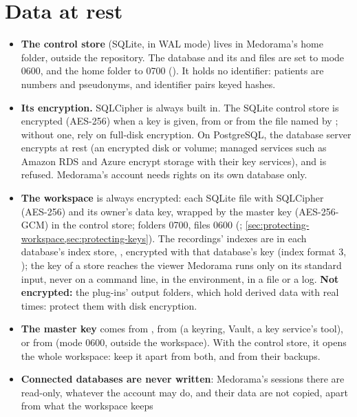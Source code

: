 \section{Data at rest}
\label{sec:security-data}

\begin{itemize}
\item \textbf{The control store} (SQLite, in WAL mode) lives in Medorama's home folder, outside
  the repository. The database and its  and  files are set to mode 0600,
  and the home folder to 0700 (). It holds no identifier: patients are numbers and
  pseudonyms, and identifier pairs keyed hashes.
\item \textbf{Its encryption.} SQLCipher is always built in. The SQLite control store is encrypted
  (AES-256) when a key is given, from  or from the file named by
  ; without one, rely on full-disk encryption. On PostgreSQL, the database server
  encrypts at rest (an encrypted disk or volume; managed services such as Amazon RDS and Azure
  encrypt storage with their key services), and  is refused. Medorama's account
  needs rights on its own database only.
\item \textbf{The workspace} is always encrypted: each SQLite file with SQLCipher (AES-256) and its
  owner's data key, wrapped by the master key (AES-256-GCM) in the control store; folders 0700,
  files 0600 (; \cref{sec:protecting-workspace,sec:protecting-keys}).
  The recordings' indexes are in each database's index store, ,
  encrypted with that database's key (index format 3, ); the key
  of a store reaches the viewer Medorama runs only on its standard input, never on a command
  line, in the environment, in a file or a log. \textbf{Not encrypted:} the plug-ins' output
  folders, which hold derived data with real times: protect them with disk encryption.
\item \textbf{The master key} comes from , from
   (a keyring, Vault, a key service's tool), or from
   (mode 0600, outside the workspace). With the control store, it opens
  the whole workspace: keep it apart from both, and from their backups.
\item \textbf{Connected databases are never written}: Medorama's sessions there are read-only,
  whatever the account may do, and their data are not copied, apart from what the workspace keeps

\end{itemize}
